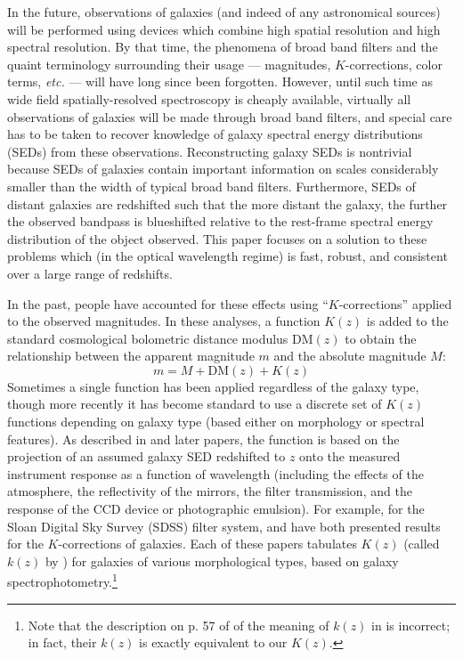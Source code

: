\documentclass[10pt,preprint]{aastex}
\begin{document}
In the future, observations of galaxies (and indeed of any
astronomical sources) will be performed using devices which combine
high spatial resolution and high spectral resolution. By that time,
the phenomena of broad band filters and the quaint terminology
surrounding their usage --- magnitudes, $K$-corrections, color terms,
{\it etc.} --- will have long since been forgotten. However, until
such time as wide field spatially-resolved spectroscopy is cheaply
available, virtually all observations of galaxies will be made through
broad band filters, and special care has to be taken to recover
knowledge of galaxy spectral energy distributions (SEDs) from these
observations.  Reconstructing galaxy SEDs is nontrivial because SEDs
of galaxies contain important information on scales considerably
smaller than the width of typical broad band filters. Furthermore,
SEDs of distant galaxies are redshifted such that the more distant the
galaxy, the further the observed bandpass is blueshifted relative to
the rest-frame spectral energy distribution of the object observed.
This paper focuses on a solution to these problems which (in the
optical wavelength regime) is fast, robust, and consistent over a
large range of redshifts.

In the past, people have accounted for these effects using
``$K$-corrections'' applied to the observed magnitudes. In these
analyses, a function $K(z)$ is added to the standard cosmological
bolometric distance modulus $\mathrm{DM}(z)$ to obtain the
relationship between the apparent magnitude $m$ and the absolute
magnitude $M$: 
\begin{equation}
\label{kcorrecteqn}
m = M + \mathrm{DM}(z) + K(z)
\end{equation}
Sometimes a single function has been applied regardless of the galaxy
type, though more recently it has become standard to use a discrete
set of $K(z)$ functions depending on galaxy type (based either on
morphology or spectral features). As described in \cite{oke68a} and
later papers, the function is based on the projection of an assumed
galaxy SED redshifted to $z$ onto the measured instrument response as
a function of wavelength (including the effects of the atmosphere, the
reflectivity of the mirrors, the filter transmission, and the response
of the CCD device or photographic emulsion). For example, for the
Sloan Digital Sky Survey (SDSS) filter system, \citet{frei94a} and
\citet{fukugita95a} have both presented results for the
$K$-corrections of galaxies. Each of these papers tabulates $K(z)$
(called $k(z)$ by \citealt{frei94a}) for galaxies of various
morphological types, based on galaxy spectrophotometry.\footnote{Note
that the description on p. 57 of \citet{binney98a} of the meaning of
$k(z)$ in \citet{frei94a} is incorrect; in fact, their $k(z)$ is
exactly equivalent to our $K(z)$.}
\end{document}
